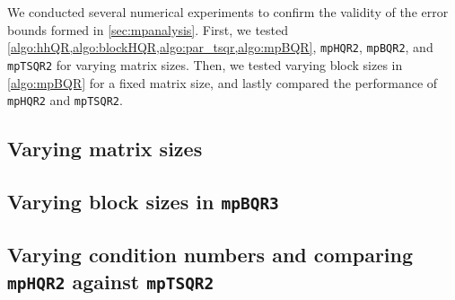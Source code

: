 We conducted several numerical experiments to confirm the validity of the error bounds formed in \cref{sec:mpanalysis}.
First, we tested \cref{algo:hhQR,algo:blockHQR,algo:par_tsqr,algo:mpBQR}, {\tt mpHQR2}, {\tt mpBQR2}, and {\tt mpTSQR2} for varying matrix sizes.
Then, we tested varying block sizes in \cref{algo:mpBQR} for a fixed matrix size, and lastly compared the performance of {\tt mpHQR2} and {\tt mpTSQR2}.
\subsection{Varying matrix sizes}
\subsection{Varying block sizes in {\tt mpBQR3}}
\subsection{Varying condition numbers and comparing {\tt mpHQR2} against {\tt mpTSQR2}}
